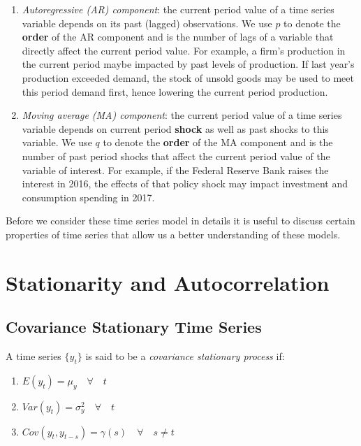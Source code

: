 \documentclass[]{book}
\providecommand{\tightlist}{%
  \setlength{\itemsep}{0pt}\setlength{\parskip}{0pt}}
\theoremstyle{definition}
\theoremstyle{definition}
\theoremstyle{definition}
\theoremstyle{remark}
\let\BeginKnitrBlock\begin \let\EndKnitrBlock\end
\begin{document}
\begin{enumerate}
\def\labelenumi{\arabic{enumi}.}
\item
  \emph{Autoregressive (AR) component}: the current period value of a
  time series variable depends on its past (lagged) observations. We use
  \(p\) to denote the \textbf{order} of the AR component and is the
  number of lags of a variable that directly affect the current period
  value. For example, a firm's production in the current period maybe
  impacted by past levels of production. If last year's production
  exceeded demand, the stock of unsold goods may be used to meet this
  period demand first, hence lowering the current period production.
\item
  \emph{Moving average (MA) component}: the current period value of a
  time series variable depends on current period \textbf{shock} as well
  as past shocks to this variable. We use \(q\) to denote the
  \textbf{order} of the MA component and is the number of past period
  shocks that affect the current period value of the variable of
  interest. For example, if the Federal Reserve Bank raises the interest
  in 2016, the effects of that policy shock may impact investment and
  consumption spending in 2017.
\end{enumerate}

Before we consider these time series model in details it is useful to
discuss certain properties of time series that allow us a better
understanding of these models.

\hypertarget{stationarity-and-autocorrelation}{%
\section{Stationarity and
Autocorrelation}\label{stationarity-and-autocorrelation}}

\hypertarget{covariance-stationary-time-series}{%
\subsection{Covariance Stationary Time
Series}\label{covariance-stationary-time-series}}

\BeginKnitrBlock{definition}[Covariance Stationary Time Series]
\protect\hypertarget{def:d7}{}{\label{def:d7} {} }
\EndKnitrBlock{definition}

A time series \(\{y_t\}\) is said to be a \emph{covariance stationary
process} if:

\begin{enumerate}
\def\labelenumi{\arabic{enumi}.}
\tightlist
\item
  \(E(y_t)=\mu_y \quad \forall \quad t\)
\item
  \(Var(y_t)=\sigma_y^2 \quad \forall \quad t\)
\item
  \(Cov(y_t,y_{t-s})=\gamma(s) \quad \forall \quad s\neq t\)
\end{enumerate}
\end{document}

